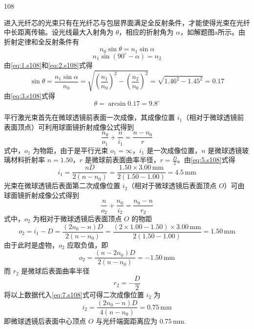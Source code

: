 \begin{solution}{108}
\begin{subsolution}
进入光纤芯的光束只有在光纤芯与包层界面满足全反射条件，才能使得光束在光纤中长距离传输。设光线最大入射角为 $\theta$，相应的折射角为 $\alpha$，如解题图a所示。由折射定律和全反射条件有
\begin{equation}
n_{0}\sin\theta = n_{1}\sin\alpha
\label{eq:1.s108}
\end{equation}
\begin{equation}
n_{1}\sin(90^{\circ} - \alpha) = n_{2}
\label{eq:2.s108}
\end{equation}
由\eqref{eq:1.s108}和\eqref{eq:2.s108}式得
\begin{equation}
\sin\theta = \frac{n_{1}\sin\alpha}{n_{0}} = \sqrt{\left(\frac{n_{1}}{n_{0}}\right)^{2} - \left(\frac{n_{2}}{n_{0}}\right)^{2}} = \sqrt{1.46^{2} - 1.45^{2}} = 0.17
\label{eq:3.s108}
\end{equation}
由\eqref{eq:3.s108}式得
\begin{equation}
\theta = \arcsin 0.17 = 9.8^{\circ}
\label{eq:4.s108}
\end{equation}
\end{subsolution}

\begin{subsolution}
平行激光束首先在微球透镜前表面一次成像，其成像位置 $i_{1}$（相对于微球透镜前表面顶点）可利用球面镜折射成像公式得到
\begin{equation}
\frac{n_{0}}{o_{1}} + \frac{n}{i_{1}} = \frac{n - n_{0}}{r}
\label{eq:5.s108}
\end{equation}
式中，$o_{1}$ 为物距，由于是平行光束 $o_{1}=\infty$，$i_{1}$ 是一次成像位置，$n$ 是微球透镜玻璃材料折射率 $n=1.50$，$r$ 是微球前表面曲率半径，$r=\frac{D}{2}$。由\eqref{eq:5.s108}式得
\begin{equation}
i_{1} = \frac{n D}{2(n - n_{0})} = \frac{1.50 \times 3.00\,\mathrm{mm}}{2(1.50 - 1.00)} = 4.5\,\mathrm{mm}
\label{eq:6.s108}
\end{equation}
光束在微球透镜后表面第二次成像位置 $i_{2}$（相对于微球透镜后表面顶点 $O$）可由球面镜折射成像公式得到
\begin{equation}
\frac{n}{o_{2}} + \frac{n_{0}}{i_{2}} = \frac{n_{0} - n}{r_{2}}
\label{eq:7.s108}
\end{equation}
式中，$o_{2}$ 为相对于微球透镜后表面顶点 $O$ 的物距
\[
o_{2} = i_{1} - D = \frac{(2n_{0} - n)D}{2(n - n_{0})} = \frac{(2\times1.00 - 1.50)\times3.00\,\mathrm{mm}}{2(1.50 - 1.00)} = 1.50\,\mathrm{mm}
\]
由于此时是虚物，$o_{2}$ 应取负值，即
\[
o_{2} = \frac{(n - 2n_{0})D}{2(n - n_{0})} = -1.50\,\mathrm{mm}
\]
而 $r_{2}$ 是微球后表面曲率半径
\[
r_{2} = -\frac{D}{2}
\]
将以上数据代入\eqref{eq:7.s108}式可得二次成像位置 $i_{2}$ 为
\begin{equation}
i_{2} = \frac{(2n_{0} - n)D}{4(n - n_{0})} = 0.75\,\mathrm{mm}
\label{eq:8.s108}
\end{equation}
即微球透镜后表面中心顶点 $O$ 与光纤端面距离应为 $0.75\,\mathrm{mm}$.
\end{subsolution}


\end{solution}
